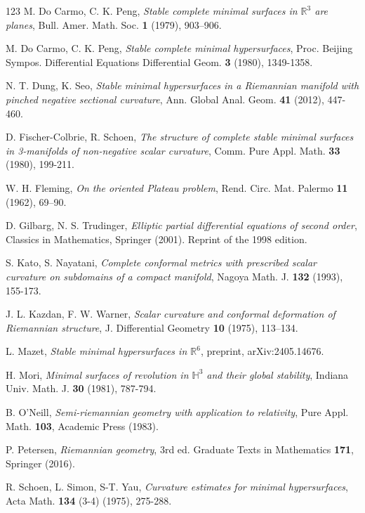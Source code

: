 \documentclass[amssymb,amstex,amsmath,11pt]{article}
\numberwithin{equation}{section}
\theoremstyle{plain}
\theoremstyle{definition}
\theoremstyle{remark}
\begin{document}
\begin{thebibliography}{123}
 M. Do Carmo, C. K. Peng, \textit{Stable complete minimal surfaces in $\mathbb{R}^3$ are planes}, Bull. Amer. Math. Soc. {\bf 1} (1979), 903–906.

 M. Do Carmo, C. K. Peng, \textit{Stable complete minimal hypersurfaces}, Proc. Beijing Sympos. Differential Equations Differential Geom. {\bf 3} (1980), 1349-1358.

 N. T. Dung, K. Seo, \textit{Stable minimal hypersurfaces in a Riemannian manifold with pinched negative sectional curvature}, Ann. Global Anal. Geom. {\bf 41} (2012), 447-460.

 D. Fischer-Colbrie, R. Schoen, \textit{The structure of complete stable minimal surfaces in 3-manifolds of non-negative scalar curvature}, Comm. Pure Appl. Math. {\bf 33} (1980), 199-211.

 W. H. Fleming, \textit{On the oriented Plateau problem}, Rend. Circ. Mat. Palermo {\bf 11} (1962), 69–90.

 D. Gilbarg, N. S. Trudinger, \textit{Elliptic partial differential equations of second order}, Classics in Mathematics, Springer (2001). Reprint of the 1998 edition.

 S. Kato, S. Nayatani, \textit{Complete conformal metrics with prescribed scalar curvature on subdomains of a compact manifold}, Nagoya Math. J. {\bf 132} (1993), 155-173.

 J. L. Kazdan, F. W. Warner, \textit{Scalar curvature and conformal deformation of Riemannian structure}, J. Differential Geometry {\bf 10} (1975), 113–134.

 L. Mazet, \textit{Stable minimal hypersurfaces in $\mathbb{R}^6$}, preprint, arXiv:2405.14676.

  H. Mori, \textit{Minimal surfaces of revolution in $\mathbb{H}^3$ and their global stability}, Indiana Univ. Math. J. {\bf 30} (1981), 787-794.

 B. O’Neill, \textit{Semi-riemannian geometry with application to relativity}, Pure Appl. Math. {\bf 103}, Academic Press (1983).

 P. Petersen, \textit{Riemannian geometry}, 3rd ed. Graduate Texts in Mathematics {\bf 171}, Springer (2016).

 R. Schoen, L. Simon, S-T. Yau, \textit{Curvature estimates for minimal hypersurfaces}, Acta Math. {\bf 134} (3-4) (1975), 275-288.


\end{thebibliography}
\end{document}
